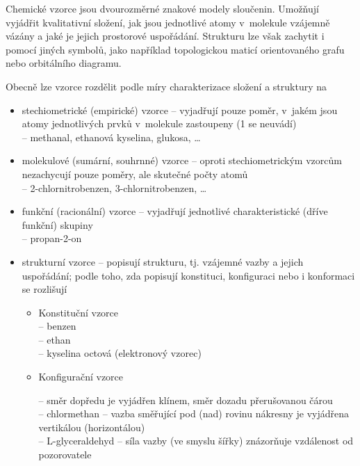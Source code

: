 Chemické vzorce jsou dvourozměrné znakové modely sloučenin. Umožňují vyjádřit
kvalitativní složení, jak jsou jednotlivé atomy v~molekule vzájemně vázány a
jaké je jejich prostorové uspořádání. Strukturu lze však zachytit i pomocí
jiných symbolů, jako například topologickou maticí orientovaného grafu nebo
orbitálního diagramu.\zlom

Obecně lze vzorce rozdělit podle míry charakterizace složení a struktury na
\begin{itemize}
	\item stechiometrické (empirické) vzorce -- vyjadřují pouze poměr, v~jakém
		  jsou atomy jednotlivých prvků v~molekule zastoupeny (1 se neuvádí) \\
		   -- methanal, ethanová kyselina, glukosa, \dots
	\item molekulové (sumární, souhrnné) vzorce -- oproti stechiometrickým
		  vzor\-cům nezachycují pouze poměry, ale skutečné počty atomů \\
		   -- 2-chlornitrobenzen, 3-chlornitrobenzen, \dots
	\item funkční (racionální) vzorce -- vyjadřují jednotlivé charakteristické
		  (dříve funkční) skupiny \\
		   -- propan-2-on
	\item strukturní vzorce -- popisují strukturu, tj. vzájemné vazby a jejich
		  uspořádání; podle toho, zda popisují konstituci, konfiguraci nebo i
		  konformaci se rozlišují
		  \begin{itemize}
				\item Konstituční vzorce \\
					   -- benzen \\
					   -- ethan \\
					   -- kyselina octová (elektronový vzorec) \zlom
				\item Konfigurační vzorce
					  \begin{itemize}
							 -- směr dopředu je vyjádřen
									klínem, směr dozadu přerušovanou čárou \\
									 -- chlormethan
							 -- vazba směřující pod
									(nad) rovinu nákresny je vyjádřena
									vertikálou (horizontálou) \\
									 -- L-glyceraldehyd
							 -- síla vazby (ve smyslu
									šířky) zná\-zor\-ňu\-je vzdálenost od pozorovatele \\

\end{itemize}
\end{itemize}
\end{itemize}
